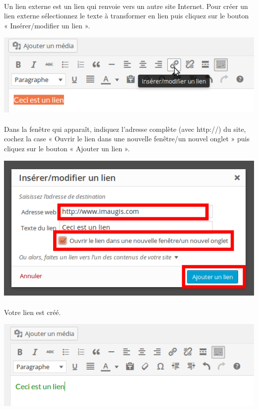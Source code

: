 \documentclass[10pt,a4paper]{article}
\begin{document}
\paragraph{}Un lien externe est un lien qui renvoie vers un autre site Internet. Pour créer un lien externe sélectionnez le texte à transformer en lien puis cliquez sur le bouton « Insérer/modifier un lien ».
\begin{center}
\includegraphics[scale=0.35]{img/0077.png}
\end{center}
\paragraph{}Dans la fenêtre qui apparaît, indiquez l'adresse complète (avec http://) du site, cochez la case « Ouvrir le lien dans une nouvelle fenêtre/un nouvel onglet » puis cliquez sur le bouton « Ajouter un lien ».
\begin{center}
\includegraphics[scale=0.35]{img/0080.png}
\end{center}
\paragraph{}Votre lien est créé.
\begin{center}
\includegraphics[scale=0.35]{img/0079.png}
\end{center}
\end{document}
